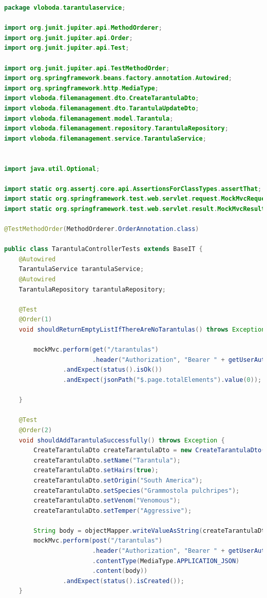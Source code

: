 \documentclass[a4paper,12pt,oneside]{article}
\begin{document}
\begin{lstlisting}[language=Java]
package vloboda.tarantulaservice;

import org.junit.jupiter.api.MethodOrderer;
import org.junit.jupiter.api.Order;
import org.junit.jupiter.api.Test;

import org.junit.jupiter.api.TestMethodOrder;
import org.springframework.beans.factory.annotation.Autowired;
import org.springframework.http.MediaType;
import vloboda.filemanagement.dto.CreateTarantulaDto;
import vloboda.filemanagement.dto.TarantulaUpdateDto;
import vloboda.filemanagement.model.Tarantula;
import vloboda.filemanagement.repository.TarantulaRepository;
import vloboda.filemanagement.service.TarantulaService;


import java.util.Optional;

import static org.assertj.core.api.AssertionsForClassTypes.assertThat;
import static org.springframework.test.web.servlet.request.MockMvcRequestBuilders.*;
import static org.springframework.test.web.servlet.result.MockMvcResultMatchers.*;

@TestMethodOrder(MethodOrderer.OrderAnnotation.class)

public class TarantulaControllerTests extends BaseIT {
    @Autowired
    TarantulaService tarantulaService;
    @Autowired
    TarantulaRepository tarantulaRepository;

    @Test
    @Order(1)
    void shouldReturnEmptyListIfThereAreNoTarantulas() throws Exception {

        mockMvc.perform(get("/tarantulas")
                        .header("Authorization", "Bearer " + getUserAuthToken()))
                .andExpect(status().isOk())
                .andExpect(jsonPath("$.page.totalElements").value(0));

    }

    @Test
    @Order(2)
    void shouldAddTarantulaSuccessfully() throws Exception {
        CreateTarantulaDto createTarantulaDto = new CreateTarantulaDto();
        createTarantulaDto.setName("Tarantula");
        createTarantulaDto.setHairs(true);
        createTarantulaDto.setOrigin("South America");
        createTarantulaDto.setSpecies("Grammostola pulchripes");
        createTarantulaDto.setVenom("Venomous");
        createTarantulaDto.setTemper("Aggressive");

        String body = objectMapper.writeValueAsString(createTarantulaDto);
        mockMvc.perform(post("/tarantulas")
                        .header("Authorization", "Bearer " + getUserAuthToken())
                        .contentType(MediaType.APPLICATION_JSON)
                        .content(body))
                .andExpect(status().isCreated());
    }


\end{lstlisting}
\end{document}
